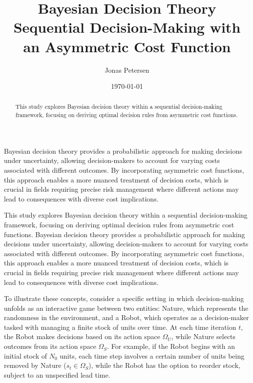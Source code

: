 \documentclass[a4paper,12pt]{article}
\title{Bayesian Decision Theory\\
	\small{Sequential Decision-Making with an Asymmetric Cost Function}}
\author{Jonas Petersen}
\date{\today}
\theoremstyle{definition}
\begin{document}
	\maketitle
	
	\begin{abstract}
		This study explores Bayesian decision theory within a sequential decision-making framework, focusing on deriving optimal decision rules from asymmetric cost functions.
	\end{abstract}
	
	\noindent
	Bayesian decision theory provides a probabilistic approach for making decisions under uncertainty, allowing decision-makers to account for varying costs associated with different outcomes. By incorporating asymmetric cost functions, this approach enables a more nuanced treatment of decision costs, which is crucial in fields requiring precise risk management where different actions may lead to consequences with diverse cost implications.

	This study explores Bayesian decision theory within a sequential decision-making framework, focusing on deriving optimal decision rules from asymmetric cost functions. Bayesian decision theory provides a probabilistic approach for making decisions under uncertainty, allowing decision-makers to account for varying costs associated with different outcomes. By incorporating asymmetric cost functions, this approach enables a more nuanced treatment of decision costs, which is crucial in fields requiring precise risk management where different actions may lead to consequences with diverse cost implications.
	
	To illustrate these concepts, consider a specific setting in which decision-making unfolds as an interactive game between two entities: Nature, which represents the randomness in the environment, and a Robot, which operates as a decision-maker tasked with managing a finite stock of units over time. At each time iteration $t$, the Robot makes decisions based on its action space $\Omega_U$, while Nature selects outcomes from its action space $\Omega_S$. For example, if the Robot begins with an initial stock of $N_0$ units, each time step involves a certain number of units being removed by Nature ($s_t \in \Omega_S$), while the Robot has the option to reorder stock, subject to an unspecified lead time.
	
\end{document}
